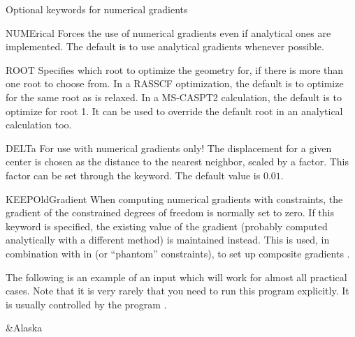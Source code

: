 Optional keywords for numerical gradients
\begin{keywordlist}
\item[NUMErical]
Forces the use of numerical gradients even if analytical ones
are implemented. The default is to use analytical gradients whenever
possible.
\item[ROOT]
Specifies which root to optimize the geometry for, if there is more than
one root to choose from. In a RASSCF optimization, the default is to
optimize for the same root as is relaxed. In a MS-CASPT2 calculation, the
default is to optimize for root 1. It can be used to override the default
root in an analytical calculation too.
\item[DELTa]
For use with numerical gradients only!
The displacement for a given center is chosen as the distance to the nearest
neighbor, scaled by a factor. This factor can be set through the 
keyword. The default value is $0.01$.
\item[KEEPOldGradient]
When computing numerical gradients with constraints, the gradient of the constrained degrees
of freedom is normally set to zero. If this keyword is specified, the existing value of the gradient
(probably computed analytically with a different method) is maintained instead.
This is used, in combination with  in  (or ``phantom''
constraints), to set up composite gradients \cite{Stenrup2015}.
\end{keywordlist}

The following is an example of an input which will work for
almost all practical cases. Note that it is very rarely that you need to run
this program explicitly. It is usually controlled by the program
.

\begin{inputlisting}
 &Alaska
\end{inputlisting}

